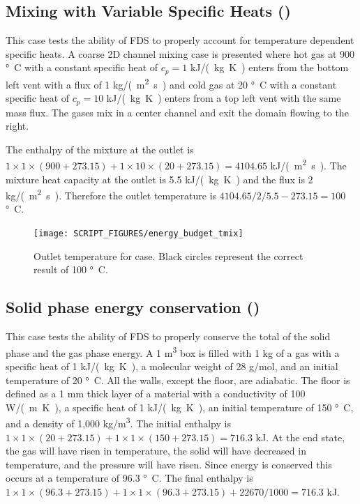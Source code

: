 \documentclass[11pt]{book}
\begin{document}
\subsection{Mixing with Variable Specific Heats (\texorpdfstring{}{energy\_budget\_tmix})}
\label{energy_budget_tmix}

This case tests the ability of FDS to properly account for temperature dependent specific heats.  A coarse 2D channel mixing case is presented where hot gas at 900 \si{\degree C} with a constant specific heat of $c_p=1$ \si{kJ/(kg.K)} enters from the bottom left vent with a flux of 1 \si{kg/(m^2.s)} and cold gas at 20 \si{\degree C} with a constant specific heat of $c_p=10$ \si{kJ/(kg.K)} enters from a top left vent with the same mass flux.  The gases mix in a center channel and exit the domain flowing to the right.

The enthalpy of the mixture at the outlet is $1 \times 1 \times (900+273.15) + 1 \times 10 \times (20+273.15) = 4104.65$ \si{kJ/(m^2.s)}.  The mixture heat capacity at the outlet is 5.5 \si{kJ/(kg.K)} and the flux is 2 \si{kg/(m^2.s)}.  Therefore the outlet temperature is $4104.65/2/5.5 - 273.15 = 100$ \si{\degree C}.
\begin{figure}[ht]
\centering
\texttt{[image: SCRIPT\_FIGURES/energy\_budget\_tmix]}
\caption[The  test case]{\label{fig_outlet_temperature} Outlet temperature for  case.  Black circles represent the correct result of 100 \si{\degree C}.}
\end{figure}


\subsection{Solid phase energy conservation (\texorpdfstring{}{energy\_budget\_solid})}
\label{energy_budget_solid}

This case tests the ability of FDS to properly conserve the total of the solid phase and the gas phase energy.  A 1 \si{m^3} box is filled with 1 kg of a gas with a specific heat of 1 \si{kJ/(kg.K)}, a molecular weight of 28 g/mol, and an initial temperature of 20 \si{\degree C}.  All the walls, except the floor, are adiabatic.  The floor is defined as a 1 mm thick layer of a material with a conductivity of 100 \si{W/(m.K)},  a specific heat of 1 \si{kJ/(kg.K)}, an initial temperature of 150 \si{\degree C}, and a density of 1,000 \si{kg/m^3}.  The initial enthalpy is $1 \times 1 \times (20+273.15) + 1 \times 1 \times (150+273.15)  =  716.3$ kJ.  At the end state, the gas will have risen in temperature, the solid will have decreased in temperature, and the pressure will have risen.  Since energy is conserved this occurs at a temperature of 96.3 \si{\degree C}.  The final enthalpy is $1 \times 1 \times (96.3+273.15) + 1 \times 1 \times (96.3+273.15) + 22670 / 1000  =  716.3$ kJ.
\end{document}
